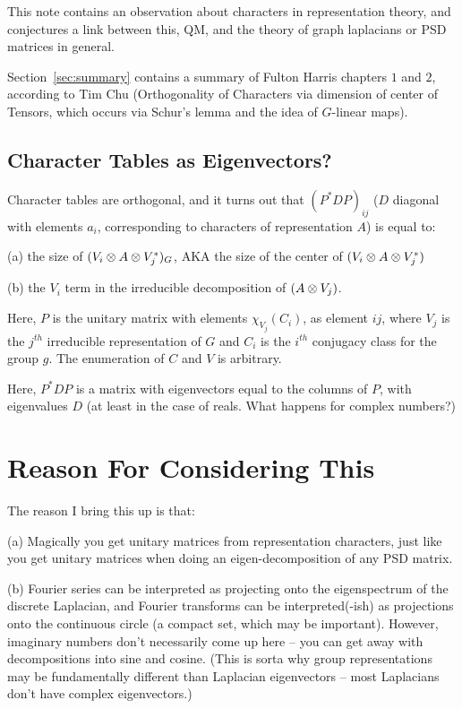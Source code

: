 


This note contains an observation about characters in
representation theory, and conjectures a link between this, QM,
and the theory of graph laplacians or PSD matrices in general.

Section~\ref{sec:summary} contains a summary of Fulton Harris chapters $1$ and $2$,
according to Tim Chu (Orthogonality of Characters via dimension
of center of Tensors, which occurs via Schur's lemma and the idea
of $G$-linear maps).

\subsection{Character Tables as Eigenvectors?}
Character tables are orthogonal, and it turns out that
$(P^{*}DP)_{ij}$ ($D$ diagonal with elements $a_i$, corresponding
to characters of representation $A$) is equal to: 

(a) the size of $(V_i \otimes A \otimes V_j^{*})_G$, AKA the size
of the center of $(V_i \otimes A \otimes V_j^{*})$ 

(b) the $V_i$ term in the irreducible decomposition of $(A
\otimes V_j)$.

Here, $P$ is the unitary matrix with elements $\chi_{V_j}(C_i)$,
as element $ij$, where $V_j$ is the $j^{th}$ irreducible
representation of $G$ and $C_i$ is the $i^{th}$ conjugacy class
for the group $g$. The enumeration of $C$ and $V$ is arbitrary.

Here, $P^{*}DP$ is a matrix with eigenvectors equal to the
columns of $P$, with eigenvalues $D$ (at least in the case of
reals. What happens for complex numbers?) 

\section{Reason For Considering This}
The reason I bring this up is that:

(a) Magically you get unitary matrices from representation
characters, just
like you get unitary matrices when doing an eigen-decomposition
of any PSD matrix.

(b) Fourier series can be interpreted as projecting onto the
eigenspectrum of the discrete Laplacian, and Fourier transforms
can be interpreted(-ish) as projections onto the continuous
circle (a compact set, which may be important). However,
imaginary numbers don't necessarily come up here -- you can get
away with decompositions into sine and cosine. (This is sorta why
group representations may be fundamentally different than Laplacian eigenvectors --
most Laplacians don't have complex eigenvectors.)

